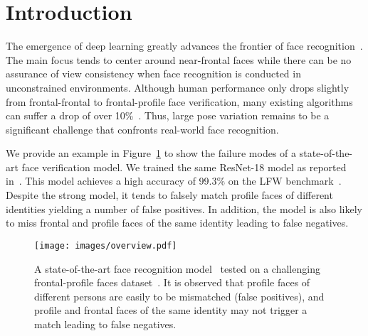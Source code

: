 \documentclass[10pt,twocolumn,letterpaper]{article}
\begin{document}
\section{Introduction}
\label{sec:introduction}


The emergence of deep learning greatly advances the frontier of face recognition~\cite{sun2014deep,taigman2014deepface}. The main focus tends to center around near-frontal faces
while there can be no assurance of view consistency when face recognition is conducted in unconstrained environments.
Although human performance only drops slightly from frontal-frontal to frontal-profile face verification, many existing algorithms can suffer a drop of over 10\%~\cite{sengupta2016frontal}.
Thus, large pose variation remains to be a significant challenge that confronts real-world face recognition.


We provide an example in Figure~\ref{fig:superROC} to show the failure modes of a state-of-the-art face verification model. We trained the same ResNet-18 model as reported in~\cite{wu2016deep}. This model achieves a high accuracy of 99.3\% on the LFW benchmark~\cite{huang2007labeled}. Despite the strong model, it tends to falsely match profile faces of different identities yielding a number of false positives. In addition, the model is also likely to miss frontal and profile faces of the same identity leading to false negatives. 

\begin{figure}[t]
\begin{center}
   \texttt{[image: images/overview.pdf]}
\end{center}
\vskip -0.4cm
   \caption{A state-of-the-art face recognition model~\cite{wu2016deep} tested on a challenging frontal-profile faces dataset~\cite{sengupta2016frontal}. 
   It is observed that profile faces of different persons are easily to be mismatched (false positives),
and profile and frontal faces of the same identity may not trigger a match leading to false negatives.}
\label{fig:superROC}
\vspace{-0.25cm}
\vskip -0.3cm
\end{figure} 
\end{document}
